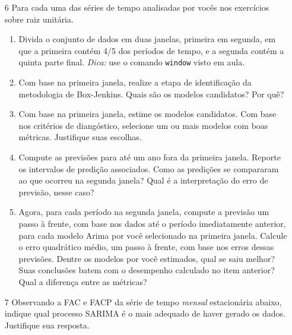 \documentclass[10pt,a4paper]{article}
\begin{document}
\begin{enumerate}
\item[6] Para cada uma das séries de tempo analisadas por vocês nos exercícios sobre raiz unitária.
\begin{enumerate}
	\item Divida o conjunto de dados em duas janelas, primeira em segunda, em que a primeira contém 4/5 dos períodos de tempo, e a segunda contém a quinta parte final. \textit{Dica:} use o comando \texttt{window} visto em aula.
	\item Com base na primeira janela, realize a etapa de identificação da metodologia de Box-Jenkins. Quais são os modelos candidatos? Por quê?
	\item Com base na primeira janela, estime os modelos candidatos. Com base nos critérios de diangóstico, selecione um ou mais modelos com boas métricas. Justifique suas escolhas.
	\item Compute as previsões para até um ano fora da primeira janela. Reporte os intervalos de predição associados. Como as predições se compararam ao que ocorreu na segunda janela? Qual é a interpretação do erro de previsão, nesse caso?
	\item Agora, para cada período na segunda janela, compute a previsão um passo à frente, com base nos dados até o período imediatamente anterior, para cada modelo Arima por você selecionado na primeira janela. Calcule o erro quadrático médio, um passo à frente, com base nos erros dessas previsões. Dentre os modelos por você estimados, qual se saiu melhor? Suas conclusões batem com o desempenho calculado no item anterior? Qual a diferença entre as métricas?
\end{enumerate}

	
\item[7]  Observando a FAC e FACP da série de tempo \emph{mensal} estacionária abaixo, indique qual processo SARIMA é o mais adequado de haver gerado os dados. Justifique sua resposta.


\end{enumerate}
\end{document}
